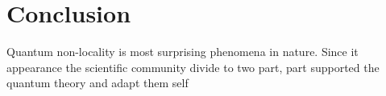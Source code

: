 \chapter{Conclusion}
Quantum non-locality is most surprising phenomena in nature. Since it appearance the scientific community divide to two part, part supported the quantum theory and adapt them self 